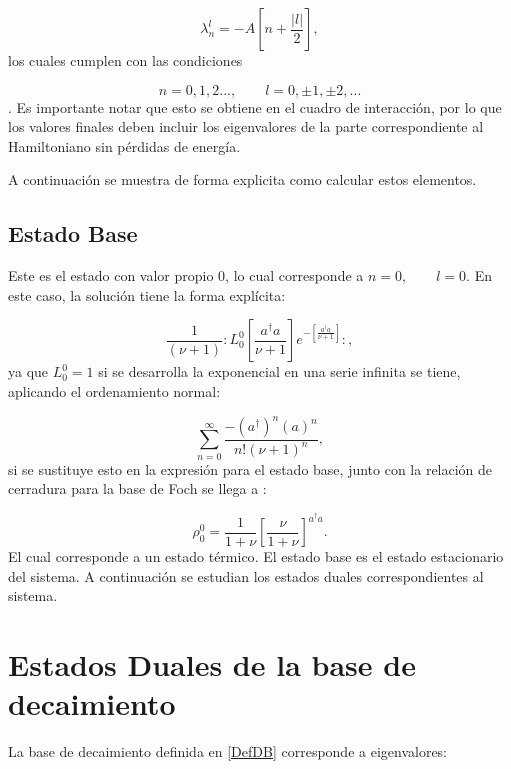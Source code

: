 \documentclass[a4paper,10pt]{report}
\begin{document}
\begin{equation}
\lambda_n^l = -A[n + \frac{|l|}{2}],
\end{equation} los cuales cumplen con las condiciones

\begin{equation}
n=0,1,2...,\qquad l = 0,\pm 1, \pm 2,... 
\end{equation}. Es importante notar que esto se obtiene en el cuadro de interacción, por lo que los valores finales deben incluir los eigenvalores de la parte correspondiente al Hamiltoniano sin pérdidas de energía.

A continuación se muestra de forma explicita como calcular estos elementos. 

\subsection{Estado Base}

Este es el estado con valor propio 0, lo cual corresponde a $n=0, \qquad l=0$. En este caso, la solución tiene la forma explícita:

\begin{equation}
\frac{1}{(\nu+1)}:L_0^0[\frac{a^\dagger a}{\nu+1}]e^{-[\frac{a^\dagger a}{\nu+1}]}:,
\end{equation} ya que $L_0^0 = 1$ \cite{ArfkenMM} si se desarrolla la exponencial en una serie infinita se tiene, aplicando el ordenamiento normal:

\begin{equation}
\sum_{n=0}^\infty \frac{-(a^\dagger)^n (a)^n}{n!(\nu+1)^n},
\end{equation} si se sustituye esto en la expresión para el estado base, junto con la relación de cerradura para la base de Foch se llega a \cite{EnglertDB}:

\begin{equation}
\rho_0^0 = \frac{1}{1+\nu} [\frac{\nu}{1+\nu}]^{a^\dagger a}.
\end{equation}El cual corresponde a un estado térmico\cite{EnglertDB}. El estado base es el estado estacionario del sistema. A continuación se estudian los estados duales correspondientes al sistema.

\section{Estados Duales de la base de decaimiento}

La base de decaimiento \cite{EnglertDB} definida en \ref{DefDB} corresponde a eigenvalores:
\end{document}
